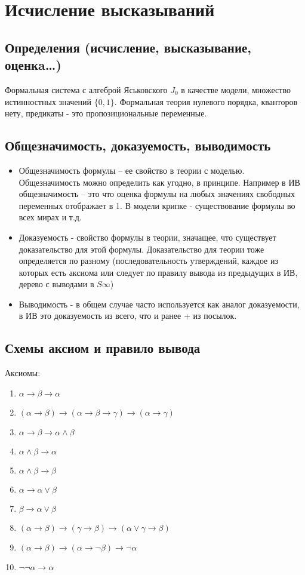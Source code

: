 \section{Исчисление высказываний}
\label{sec-3}
\subsection{Определения (исчисление, высказывание, оценкa\ldots{})}
\label{sec-3-1}
Формальная система с алгеброй Яськовского $J_{0}$ в качестве модели, множество
истинностных значений $\lbrace 0, 1 \rbrace$. Формальная теория нулевого порядка, кванторов
нету, предикаты - это пропозициональные переменные.
\subsection{Общезначимость, доказуемость, выводимость}
\label{sec-3-2}
\begin{itemize}
\item Общезначимость формулы -- ее свойство в теории с моделью. Общезначимость
можно определить как угодно, в принципе. Например в ИВ общезначимость --
это что оценка формулы на любых значениях свободных переменных отображает
в 1. В модели крипке - существование формулы во всех мирах и т.д.
\item Доказуемость - свойство формулы в теории, значащее, что существует
доказательство для этой формулы. Доказательство для теории тоже определяется
по разному (последовательность утверждений, каждое из которых есть аксиома
или следует по правилу вывода из предыдущих в ИВ, дерево с выводами в $S\infty$)
\item Выводимость - в общем случае часто используется как аналог доказуемости,
в ИВ это доказуемость из всего, что и ранее + из посылок.
\end{itemize}
\subsection{Схемы аксиом и правило вывода}
\label{sec-3-3}
Аксиомы:
\begin{enumerate}
\item $\alpha \to \beta \to \alpha$
\item $(\alpha \to \beta) \to (\alpha \to \beta \to \gamma) \to (\alpha \to \gamma)$
\item $\alpha \to \beta \to \alpha \land \beta$
\item $\alpha \land \beta \to \alpha$
\item $\alpha \land \beta \to \beta$
\item $\alpha \to \alpha \lor \beta$
\item $\beta \to \alpha \lor \beta$
\item $(\alpha \to \beta) \to (\gamma \to \beta) \to (\alpha \lor \gamma \to \beta)$
\item $(\alpha \to \beta) \to (\alpha \to \lnot \beta) \to \lnot \alpha$
\item $\lnot \lnot \alpha \to \alpha$
\end{enumerate}

